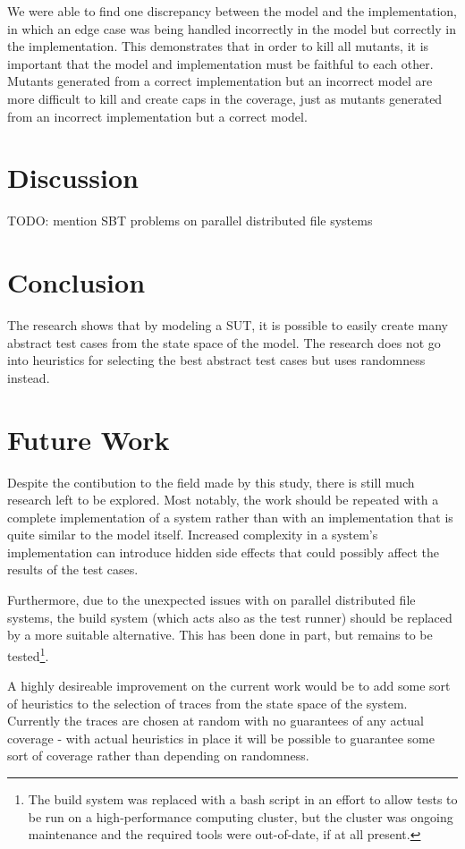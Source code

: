 \documentclass{article}
\begin{document}
		We were able to find one discrepancy between the model and the implementation, in which an edge case was being handled incorrectly in the model but correctly in the implementation. This demonstrates that in order to kill all mutants, it is important that the model and implementation must be faithful to each other. Mutants generated from a correct implementation but an incorrect model are more difficult to kill and create caps in the coverage, just as mutants generated from an incorrect implementation but a correct model.

	\section{Discussion}
		TODO: mention SBT problems on parallel distributed file systems


	\section{Conclusion}
		The research shows that by modeling a SUT, it is possible to easily create many abstract test cases from the state space of the model. The research does not go into heuristics for selecting the best abstract test cases but uses randomness instead. 

	\section{Future Work}
		Despite the contibution to the field made by this study, there is still much research left to be explored. Most notably, the work should be repeated with a complete implementation of a system rather than with an implementation that is quite similar to the model itself. Increased complexity in a system's implementation can introduce hidden side effects that could possibly affect the results of the test cases.

		Furthermore, due to the unexpected issues with \citeauthor{sbt} on parallel distributed file systems, the build system (which acts also as the test runner) should be replaced by a more suitable alternative. This has been done in part, but remains to be tested\footnote{The build system was replaced with a bash script in an effort to allow tests to be run on a high-performance computing cluster, but the cluster was ongoing maintenance and the required tools were out-of-date, if at all present.}.

		A highly desireable improvement on the current work would be to add some sort of heuristics to the selection of traces from the state space of the system. Currently the traces are chosen at random with no guarantees of any actual coverage \-- with actual heuristics in place it will be possible to guarantee some sort of coverage rather than depending on randomness.
\end{document}
